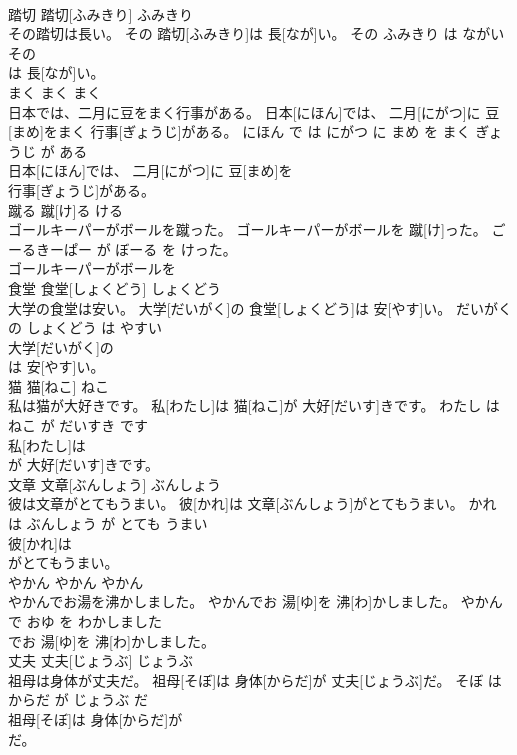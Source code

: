 \documentclass[8pt]{extreport}
\begin{document}
\begin{CJK}{UTF8}{min}
\\	踏切	踏切[ふみきり]	ふみきり	
\\	その踏切は長い。	その 踏切[ふみきり]は 長[なが]い。	その ふみきり は ながい	
\\	その
\\	は 長[なが]い。		
\\	まく	まく	まく	
\\	日本では、二月に豆をまく行事がある。	日本[にほん]では、 二月[にがつ]に 豆[まめ]をまく 行事[ぎょうじ]がある。	にほん で は にがつ に まめ を まく ぎょうじ が ある	
\\	日本[にほん]では、 二月[にがつ]に 豆[まめ]を
\\	行事[ぎょうじ]がある。		
\\	蹴る	蹴[け]る	ける	
\\	ゴールキーパーがボールを蹴った。	ゴールキーパーがボールを 蹴[け]った。	ごーるきーぱー が ぼーる を けった。	
\\	ゴールキーパーがボールを
\\	食堂	食堂[しょくどう]	しょくどう	
\\	大学の食堂は安い。	大学[だいがく]の 食堂[しょくどう]は 安[やす]い。	だいがく の しょくどう は やすい	
\\	大学[だいがく]の
\\	は 安[やす]い。		
\\	猫	猫[ねこ]	ねこ	
\\	私は猫が大好きです。	私[わたし]は 猫[ねこ]が 大好[だいす]きです。	わたし は ねこ が だいすき です	
\\	私[わたし]は
\\	が 大好[だいす]きです。		
\\	文章	文章[ぶんしょう]	ぶんしょう	
\\	彼は文章がとてもうまい。	彼[かれ]は 文章[ぶんしょう]がとてもうまい。	かれ は ぶんしょう が とても うまい	
\\	彼[かれ]は
\\	がとてもうまい。		
\\	やかん	やかん	やかん	
\\	やかんでお湯を沸かしました。	やかんでお 湯[ゆ]を 沸[わ]かしました。	やかん で おゆ を わかしました	
\\	でお 湯[ゆ]を 沸[わ]かしました。		
\\	丈夫	丈夫[じょうぶ]	じょうぶ	
\\	祖母は身体が丈夫だ。	祖母[そぼ]は 身体[からだ]が 丈夫[じょうぶ]だ。	そぼ は からだ が じょうぶ だ	
\\	祖母[そぼ]は 身体[からだ]が
\\	だ。		

\end{CJK}
\end{document}

